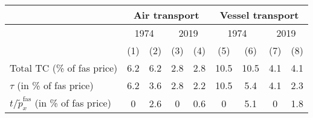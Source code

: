 \begin{tabular}{l|cc|cc||cc|cc}
& \multicolumn{4}{|c||}{Air transport} & \multicolumn{4}{|c}{Vessel transport} \\ \hline
& \multicolumn{2}{|c|}{1974} & \multicolumn{2}{|c||}{2019} & \multicolumn{2}{|c|}{1974} & \multicolumn{2}{|c}{2019}\\
& (1) & (2) &  (3) & (4) & (5) & (6) &  (7) & (8)\\ \hline
Total TC (\% of fas price) & 6.2 & 6.2 & 2.8 & 2.8 & 10.5 & 10.5 & 4.1 & 4.1 \\
$\tau$ (in \% of fas price) & 6.2 & 3.6 & 2.8 & 2.2 & 10.5 & 5.4 & 4.1 & 2.3\\
$t/\widetilde{p}^{\text{fas}}_x$ (in \% of fas price) & 0 & 2.6 & 0 & 0.6 & 0 & 5.1 & 0 & 1.8\\
\hline \hline
\end{tabular} 